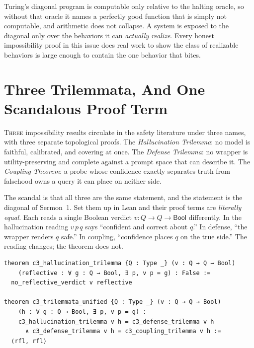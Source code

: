 \documentclass[11pt,twoside]{article}
\newcounter{verse}[section]
\newcommand{\vp}{\par\medskip\refstepcounter{verse}%
  \noindent\llap{{\bfseries\scriptsize\thesection:\theverse}\hspace*{0.9em}}}
\renewcommand{\thesection}{\arabic{section}}
\begin{document}
\begin{caution}
Turing's diagonal program is computable only relative to the halting oracle, so
without that oracle it names a perfectly good function that is simply not
computable, and arithmetic does not collapse. A system is exposed to the diagonal
only over the behaviors it can \emph{actually realize}. Every honest impossibility
proof in this issue does real work to show the class of realizable behaviors is
large enough to contain the one behavior that bites.
\end{caution}

\section{Three Trilemmata, And One Scandalous Proof Term}

\lettrine[lines=3]{T}{hree} impossibility results circulate in the safety
literature under three names, with three separate topological proofs. The
\emph{Hallucination Trilemma}: no model is faithful, calibrated, and covering at
once. The \emph{Defense Trilemma}: no wrapper is utility-preserving and complete
against a prompt space that can describe it. The \emph{Coupling Theorem}: a probe
whose confidence exactly separates truth from falsehood owns a query it can place
on neither side.

\vp The scandal is that all three are the same statement, and the statement is
the diagonal of Sermon~1. Set them up in Lean and their proof terms are
\emph{literally equal}. Each reads a single Boolean verdict $v : Q \to Q \to
\textsf{Bool}$ differently. In the hallucination reading $v\,p\,q$ says ``confident
and correct about $q$.'' In defense, ``the wrapper renders $q$ safe.'' In coupling,
``confidence places $q$ on the true side.'' The reading changes; the theorem does
not.

\begin{poc}
\begin{lstlisting}
theorem c3_hallucination_trilemma {Q : Type _} (v : Q → Q → Bool)
    (reflective : ∀ g : Q → Bool, ∃ p, v p = g) : False :=
  no_reflective_verdict v reflective

theorem c3_trilemmata_unified {Q : Type _} (v : Q → Q → Bool)
    (h : ∀ g : Q → Bool, ∃ p, v p = g) :
    c3_hallucination_trilemma v h = c3_defense_trilemma v h
      ∧ c3_defense_trilemma v h = c3_coupling_trilemma v h :=
  ⟨rfl, rfl⟩
\end{lstlisting}
\end{poc}
\end{document}
